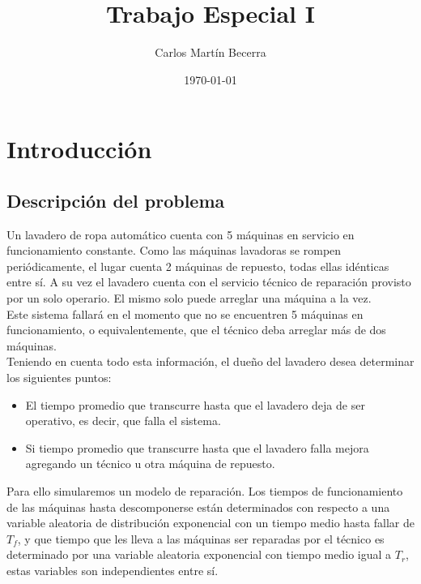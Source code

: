 \documentclass[10pt,a4paper]{article} %
\begin{document}
    \title{Trabajo Especial I}
    \author{Carlos Mart\'in Becerra}
    \date{\today} %
    
    \maketitle
    
    \tableofcontents
    
    \newpage
    \section{Introducci\'on}
    \subsection{Descripci\'on del problema}
    Un lavadero de ropa autom\'atico cuenta con 5 m\'aquinas en servicio en funcionamiento constante. Como las m\'aquinas lavadoras se rompen peri\'odicamente, el lugar cuenta 2 m\'aquinas de repuesto, todas ellas id\'enticas entre s\'i. A su vez el lavadero cuenta con el servicio t\'ecnico de reparaci\'on provisto por un solo operario. El mismo solo puede arreglar una m\'aquina a la vez.\\
    Este sistema fallar\'a en el momento que no se encuentren 5 m\'aquinas en funcionamiento, o equivalentemente, que el t\'ecnico deba arreglar m\'as de dos m\'aquinas.\\
    Teniendo en cuenta todo esta informaci\'on, el due\~no del lavadero desea determinar los siguientes puntos:

    \begin{itemize}
    \item El tiempo promedio que transcurre hasta que el lavadero deja de ser operativo, es decir, que falla el sistema.
    \item Si tiempo promedio que transcurre hasta que el lavadero falla mejora agregando un t\'ecnico u otra m\'aquina de repuesto.
    \end{itemize}
    
    Para ello simularemos un modelo de reparaci\'on. Los tiempos de funcionamiento de las m\'aquinas hasta descomponerse est\'an determinados con respecto a una variable aleatoria de distribuci\'on exponencial con un tiempo medio hasta fallar de $T_f$, y que tiempo que les lleva a las m\'aquinas ser reparadas por el t\'ecnico es determinado por una variable aleatoria exponencial con tiempo medio igual a $T_r$, estas variables son independientes entre s\'i.
    
\end{document}
